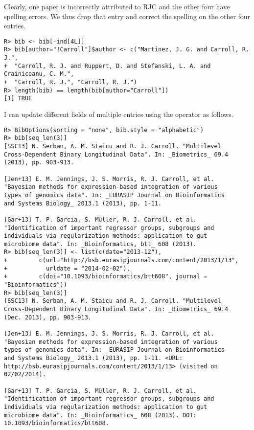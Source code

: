 \documentclass[article]{jss}\usepackage[]{graphicx}\usepackage[]{color}
\makeatletter
\newenvironment{kframe}{%
 \def\at@end@of@kframe{}%
 \ifinner\ifhmode%
  \def\at@end@of@kframe{\end{minipage}}%
  \begin{minipage}{\columnwidth}%
 \fi\fi%
 \def\FrameCommand##1{\hskip\@totalleftmargin \hskip-\fboxsep
 \colorbox{shadecolor}{##1}\hskip-\fboxsep
     \hskip-\linewidth \hskip-\@totalleftmargin \hskip\columnwidth}%
 \MakeFramed {\advance\hsize-\width
   \@totalleftmargin\z@ \linewidth\hsize
   \@setminipage}}%
 {\par\unskip\endMakeFramed%
 \at@end@of@kframe}
\newenvironment{knitrout}{}{} %
\newcommand{\bt}{\`{}}
\makeatother
\begin{document}
Clearly, one paper is incorrectly attributed to RJC and the other four have spelling errors.  We thus drop that entry and correct the spelling on the other four entries.
\begin{knitrout}
\color{fgcolor}\begin{kframe}
\begin{verbatim}
R> bib <- bib[-ind[4L]]
R> bib[author="!Carroll"]$author <- c("Martinez, J. G. and Carroll, R. J.",
+  "Carroll, R. J. and Ruppert, D. and Stefanski, L. A. and Crainiceanu, C. M.",
+  "Carroll, R. J.", "Carroll, R. J.")
R> length(bib) == length(bib[author="Carroll"])
[1] TRUE
\end{verbatim}
\end{kframe}
\end{knitrout}

I can update different fields of multiple entries using the operator \code{\bt[<-\bt} as follows.  
\begin{knitrout}
\color{fgcolor}\begin{kframe}
\begin{verbatim}
R> BibOptions(sorting = "none", bib.style = "alphabetic")
R> bib[seq_len(3)]
[SSC13] N. Serban, A. M. Staicu and R. J. Carroll. "Multilevel
Cross-Dependent Binary Longitudinal Data". In: _Biometrics_ 69.4
(2013), pp. 903-913.

[Jen+13] E. M. Jennings, J. S. Morris, R. J. Carroll, et al.
"Bayesian methods for expression-based integration of various
types of genomics data". In: _EURASIP Journal on Bioinformatics
and Systems Biology_ 2013.1 (2013), pp. 1-11.

[Gar+13] T. P. Garcia, S. Müller, R. J. Carroll, et al.
"Identification of important regressor groups, subgroups and
individuals via regularization methods: application to gut
microbiome data". In: _Bioinformatics, btt_ 608 (2013).
R> bib[seq_len(3)] <- list(c(date="2013-12"),
+         c(url="http://bsb.eurasipjournals.com/content/2013/1/13", 
+           urldate = "2014-02-02"),
+         c(doi="10.1093/bioinformatics/btt608", journal = "Bioinformatics"))
R> bib[seq_len(3)]
[SSC13] N. Serban, A. M. Staicu and R. J. Carroll. "Multilevel
Cross-Dependent Binary Longitudinal Data". In: _Biometrics_ 69.4
(Dec. 2013), pp. 903-913.

[Jen+13] E. M. Jennings, J. S. Morris, R. J. Carroll, et al.
"Bayesian methods for expression-based integration of various
types of genomics data". In: _EURASIP Journal on Bioinformatics
and Systems Biology_ 2013.1 (2013), pp. 1-11. <URL:
http://bsb.eurasipjournals.com/content/2013/1/13> (visited on
02/02/2014).

[Gar+13] T. P. Garcia, S. Müller, R. J. Carroll, et al.
"Identification of important regressor groups, subgroups and
individuals via regularization methods: application to gut
microbiome data". In: _Bioinformatics_ 608 (2013). DOI:
10.1093/bioinformatics/btt608.
\end{verbatim}
\end{kframe}
\end{knitrout}
\end{document}
